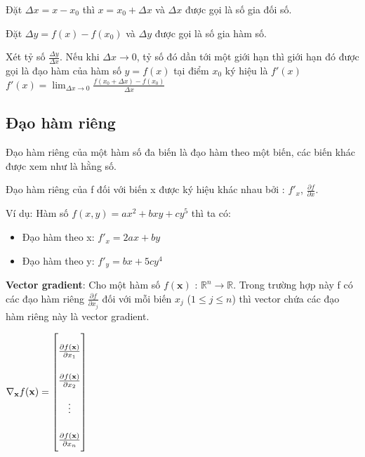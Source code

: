 Đặt $   \Delta x=x-x_0$ thì $  x = x_0+\Delta x$ và $\Delta x$ được gọi là số gia đối số. \par

Đặt $  \Delta y = f(x)-f(x_0)$ và $\Delta y$ được gọi là số gia hàm số. \par

Xét tỷ số ${  {\frac {\Delta y}{\Delta x}}}$. Nếu khi $  \Delta x\rightarrow0$, tỷ số đó dần tới một giới hạn thì giới hạn đó được gọi là đạo hàm của hàm số $  y=f(x)$ tại điểm $  x_0$ ký hiệu là ${  f'(x)}$\\

${  f'(x)=\lim _{\Delta x\rightarrow 0}{\frac {f(x_{0}+\Delta x)-f(x_{0})}{\Delta x}}}  $
\subsection{Đạo hàm riêng}
Đạo hàm riêng của một hàm số đa biến là đạo hàm theo một biến, các biến khác được xem như là hằng số. \par
Đạo hàm riêng của f đối với biến x được ký hiệu khác nhau bởi : ${  f'_x }$,  ${  \frac{\partial f}{\partial x} }.$\par
Ví dụ: Hàm số $f(x,y) = ax^2 + bxy + cy^5$ thì ta có:
\begin{itemize}
\setlength{\itemindent}{10mm}
	\item Đạo hàm theo x: ${  f'_x = 2ax +by}$
	\item Đạo hàm theo y: ${  f'_y = bx +5cy^4}$	
\end{itemize}

\textbf{Vector gradient}:
Cho một hàm số $f(\textbf{x})$ : $\mathbb{R}^n \rightarrow \mathbb{R}$. Trong trường hợp này f có các đạo hàm riêng $   \frac{\partial f}{\partial x_j}$ đối với mỗi biến $ x_j$ ($1\leq j \leq n$) thì vector chứa các đạo hàm riêng này là vector gradient.\par
\begin{center}

$ \nabla_\textbf{x}f(\textbf{x}) =
\renewcommand{\arraystretch}{2.5} 
\begin{bmatrix}

\frac{\partial f(\textbf{x})}{\partial x_1}\\ \frac{\partial f(\textbf{x})}{\partial x_2} \\ \vdots \\ \frac{\partial f(\textbf{x})}{\partial x_n}
\end{bmatrix}  $
\end{center}

